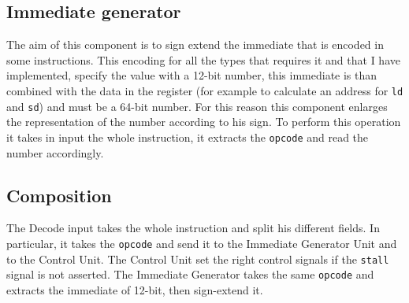\documentclass{article}
\begin{document}
\subsection{Immediate generator}\label{immgen}
The aim of this component is to sign extend the immediate that is encoded in some instructions. 
This encoding for all the types that requires it and that I have implemented, 
specify the value with a 12-bit number, this immediate is than combined with the data in the register 
(for example to calculate an address for \texttt{ld} and \texttt{sd}) and must be a 64-bit number. 
For this reason this component enlarges the representation of the number according to his sign. 
To perform this operation it takes in input the whole instruction, it extracts the \texttt{opcode} and read the number accordingly.
\subsection*{Composition}
The Decode input takes the whole instruction and split his different fields. In particular, it takes the \texttt{opcode} 
and send it to the Immediate Generator Unit and to the Control Unit. The Control Unit set the right control signals if the \texttt{stall}
signal is not asserted. The Immediate Generator takes the same \texttt{opcode} and extracts the immediate of 12-bit, then sign-extend it.
\end{document}
